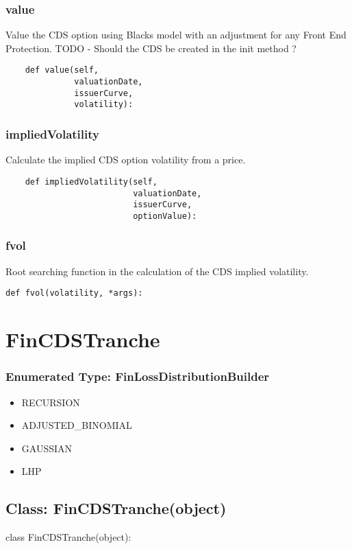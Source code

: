 \documentclass[twoside,11pt]{book}
\begin{document}
\subsubsection*{{\bf value}}
Value the CDS option using Blacks model with an adjustment for any Front End Protection. TODO - Should the CDS be created in the init method ?  

\begin{lstlisting}
    def value(self,
              valuationDate,
              issuerCurve,
              volatility):
\end{lstlisting}

\subsubsection*{{\bf impliedVolatility}}
Calculate the implied CDS option volatility from a price.  

\begin{lstlisting}
    def impliedVolatility(self,
                          valuationDate,
                          issuerCurve,
                          optionValue):
\end{lstlisting}

\subsubsection*{{\bf fvol}}
Root searching function in the calculation of the CDS implied volatility.  

\begin{lstlisting}
def fvol(volatility, *args):
\end{lstlisting}

\newpage
\section{FinCDSTranche}

\subsubsection{Enumerated Type: FinLossDistributionBuilder}
\begin{itemize}
\item{RECURSION}
\item{ADJUSTED\_BINOMIAL}
\item{GAUSSIAN}
\item{LHP}
\end{itemize}

\subsection*{Class: FinCDSTranche(object)}
class FinCDSTranche(object): 
\end{document}
